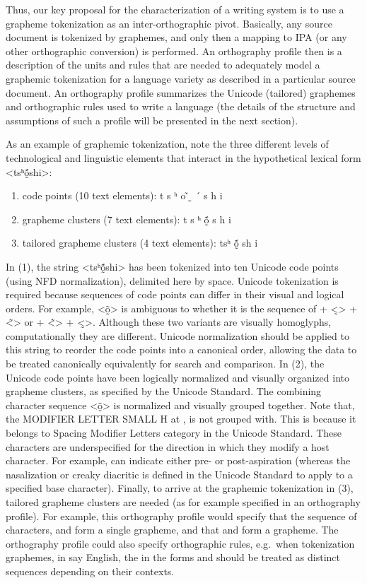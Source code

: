 Thus, our key proposal for the characterization of a writing system is to use a
grapheme tokenization as an inter-orthographic pivot. Basically, any source
document is tokenized by graphemes, and only then a mapping to IPA (or any other
orthographic conversion) is performed. An orthography profile then is a
description of the units and rules that are needed to adequately model a
graphemic tokenization for a language variety as described in a particular
source document. An orthography profile summarizes the Unicode (tailored)
graphemes and orthographic rules used to write a language (the details of the
structure and assumptions of such a profile will be presented in the next
section).


As an example of graphemic tokenization, note the three different levels of
technological and linguistic elements that interact in the hypothetical lexical
form <tsʰṍ̰shi>:

\begin{enumerate}
	\def\labelenumi{\arabic{enumi}.} 
	\item code points (10 text elements): t s ʰ o ̃ ̰ ´ s h i 
	\item grapheme clusters (7 text elements): t s ʰ ṍ̰ s h i 
	\item tailored grapheme clusters (4 text elements): tsʰ ṍ̰ sh i 
\end{enumerate}

In (1), the string <tsʰṍ̰shi> has been tokenized into ten Unicode code points
(using NFD normalization), delimited here by space. Unicode tokenization is
required because sequences of code points can differ in their visual and logical
orders. For example, <õ̰> is ambiguous to whether it is the sequence of + <̰> +
<̃> or + <̃> + <̰>. Although these two variants are visually homoglyphs,
computationally they are different. Unicode normalization should be applied to
this string to reorder the code points into a canonical order, allowing the data
to be treated canonically equivalently for search and comparison. In (2), the
Unicode code points have been logically normalized and visually organized into
grapheme clusters, as specified by the Unicode Standard. The combining character
sequence <õ̰> is normalized and visually grouped together. Note that, the
MODIFIER LETTER SMALL H at , is not grouped with. This is because it
belongs to Spacing Modifier Letters category in the Unicode Standard. These
characters are underspecified for the direction in which they modify a host
character. For example, can indicate either pre- or post-aspiration (whereas the
nasalization or creaky diacritic is defined in the Unicode Standard to apply to
a specified base character). Finally, to arrive at the graphemic tokenization in
(3), tailored grapheme clusters are needed (as for example specified in an
orthography profile). For example, this orthography profile would specify that
the sequence of characters, and form a single grapheme, and that and form a
grapheme. The orthography profile could also specify orthographic rules,
e.g.~when tokenization graphemes, in say English, the in the forms and should be
treated as distinct sequences depending on their contexts.

